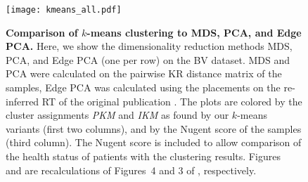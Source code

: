 \begin{figure}[p]
    \centering
    \texttt{[image: kmeans\_all.pdf]}
    \begin{subfigure}{0pt}
        \label{fig:kmeans_all:sub:mds_em}
    \end{subfigure}
    \begin{subfigure}{0pt}
        \label{fig:kmeans_all:sub:mds_ei}
    \end{subfigure}
    \begin{subfigure}{0pt}
        \label{fig:kmeans_all:sub:mds_ns}
    \end{subfigure}
    \begin{subfigure}{0pt}
        \label{fig:kmeans_all:sub:pca_em}
    \end{subfigure}
    \begin{subfigure}{0pt}
        \label{fig:kmeans_all:sub:pca_ei}
    \end{subfigure}
    \begin{subfigure}{0pt}
        \label{fig:kmeans_all:sub:pca_ns}
    \end{subfigure}
    \begin{subfigure}{0pt}
        \label{fig:kmeans_all:sub:epca_em}
    \end{subfigure}
    \begin{subfigure}{0pt}
        \label{fig:kmeans_all:sub:epca_ei}
    \end{subfigure}
    \begin{subfigure}{0pt}
        \label{fig:kmeans_all:sub:epca_ns}
    \end{subfigure}
    \caption[Comparison of $k$-means clustering to MDS, PCA, and Edge PCA]{
        \textbf{Comparison of $k$-means clustering to MDS, PCA, and Edge PCA.}
        Here, we show the dimensionality reduction methods MDS, PCA, and Edge PCA (one per row) on the \ac{BV} dataset.
        MDS and PCA were calculated on the pairwise KR distance matrix of the samples,
        Edge PCA was calculated using the placements on the re-inferred \ac{RT} of the original publication \cite{Srinivasan2012}.
        The plots are colored by the cluster assignments \emph{PKM} and \emph{IKM}
        as found by our $k$-means variants (first two columns), and by the Nugent score of the samples (third column).
        The Nugent score is included to allow comparison of the health status of patients with the clustering results.
        Figures~ and  are recalculations of
        Figures~4 and 3 of , respectively.
    }
    \label{fig:kmeans_all}
\end{figure}

